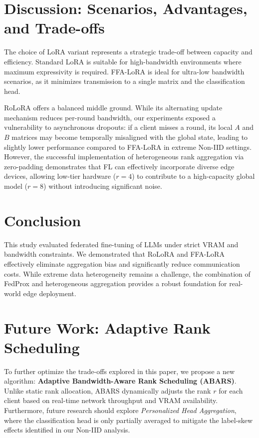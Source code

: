 \section{Discussion: Scenarios, Advantages, and Trade-offs}
The choice of LoRA variant represents a strategic trade-off between capacity and efficiency. Standard LoRA is suitable for high-bandwidth environments where maximum expressivity is required. FFA-LoRA is ideal for ultra-low bandwidth scenarios, as it minimizes transmission to a single matrix and the classification head.

RoLoRA offers a balanced middle ground. While its alternating update mechanism reduces per-round bandwidth, our experiments exposed a vulnerability to asynchronous dropouts: if a client misses a round, its local $A$ and $B$ matrices may become temporally misaligned with the global state, leading to slightly lower performance compared to FFA-LoRA in extreme Non-IID settings. However, the successful implementation of heterogeneous rank aggregation via zero-padding demonstrates that FL can effectively incorporate diverse edge devices, allowing low-tier hardware ($r=4$) to contribute to a high-capacity global model ($r=8$) without introducing significant noise.

\section{Conclusion}
This study evaluated federated fine-tuning of LLMs under strict VRAM and bandwidth constraints. We demonstrated that RoLoRA and FFA-LoRA effectively eliminate aggregation bias and significantly reduce communication costs. While extreme data heterogeneity remains a challenge, the combination of FedProx and heterogeneous aggregation provides a robust foundation for real-world edge deployment.

\section{Future Work: Adaptive Rank Scheduling}
To further optimize the trade-offs explored in this paper, we propose a new algorithm: \textbf{Adaptive Bandwidth-Aware Rank Scheduling (ABARS)}. Unlike static rank allocation, ABARS dynamically adjusts the rank $r$ for each client based on real-time network throughput and VRAM availability. Furthermore, future research should explore \textit{Personalized Head Aggregation}, where the classification head is only partially averaged to mitigate the label-skew effects identified in our Non-IID analysis.

